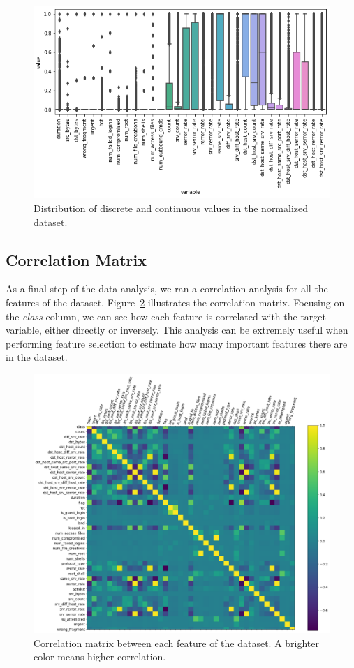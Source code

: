 \begin{figure}[h]
    \centering
    \includegraphics[width=\linewidth]{img/box-norm.png}
    \caption{Distribution of discrete and continuous values in the normalized dataset.}
    \label{fig:contdist}
\end{figure}
\FloatBarrier


\subsection{Correlation Matrix}

As a final step of the data analysis, we ran a correlation analysis for all the features of the dataset. Figure~\ref{fig:corr} illustrates the correlation matrix. Focusing on the \textit{class} column, we can see how each feature is correlated with the target variable, either directly or inversely. This analysis can be extremely useful when performing feature selection to estimate how many important features there are in the dataset.

\FloatBarrier

\begin{figure}[h]
    \centering
    \includegraphics[width=0.9\linewidth]{img/corr1.png}
    \caption{Correlation matrix between each feature of the dataset. A brighter color means higher correlation.}
    \label{fig:corr}
\end{figure}

\FloatBarrier